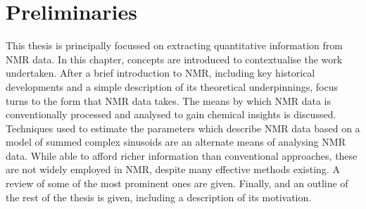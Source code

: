 \chapter{Preliminaries}
\label{chap:intro}
This thesis is principally focussed on extracting quantitative information
from \ac{NMR} data. In this chapter, concepts are introduced to
contextualise the work undertaken.
After a brief introduction to \ac{NMR}, including key historical developments
and a simple description of its theoretical underpinnings, focus turns to
the form that \ac{NMR} data takes. The means by which \ac{NMR} data is
conventionally processed and analysed to gain chemical insights is discussed.
Techniques used to estimate the parameters which describe \ac{NMR} data based
on a model of summed complex sinusoids are an alternate means of analysing
\ac{NMR} data. While able to afford richer information than conventional
approaches, these are not widely employed in \ac{NMR}, despite many effective
methods existing. A review of some of the most prominent ones are given.
Finally, and an outline of the rest of the thesis is given, including a
description of its motivation.





